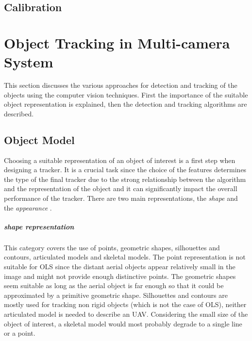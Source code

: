 \section{Calibration}

\chapter{Object Tracking in Multi-camera System}

This section discusses the various approaches for detection and tracking of the objects using the computer vision techniques. First the importance of the suitable object representation is explained, then the detection and tracking algorithms are described.

\section{Object Model}

Choosing a suitable representation of an object of interest is a first step when designing a tracker. It is a crucial task since the choice of the features determines the type of the final tracker due to the strong relationship between the algorithm and the representation of the object and it can significantly impact the overall performance of the tracker. There are two main representations, the \textit{shape} and the \textit{appearance} \cite{Yilmaz:2006:OTS:1177352.1177355}.

\paragraph{shape representation} 
This category covers the use of points, geometric shapes, silhouettes and contours, articulated models and skeletal models. The point representation is not suitable for OLS since the distant aerial objects appear relatively small in the image and might not provide enough distinctive points. The geometric shapes seem suitable as long as the aerial object is far enough so that it could be approximated by a primitive geometric shape. Silhouettes and contours are mostly used for tracking non rigid objects (which is not the case of OLS), neither articulated model is needed to describe an UAV. Considering the small size of the object of interest, a skeletal model would most probably degrade to a single line or a point.


